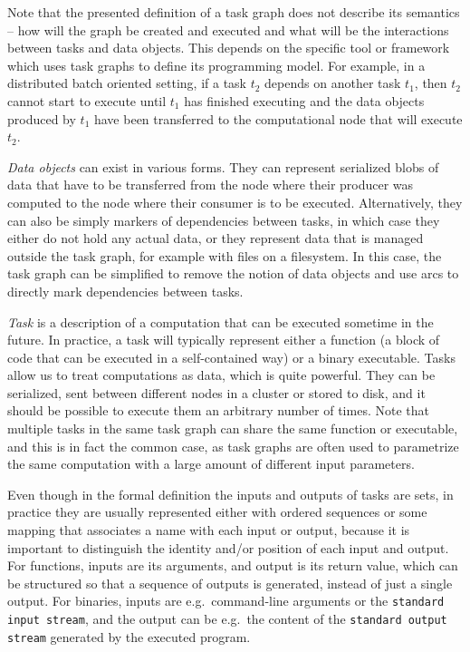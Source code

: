 Note that the presented definition of a task graph does not describe its semantics -- how will the
graph be created and executed and what will be the interactions between tasks and data objects.
This depends on the specific tool or framework which uses task graphs to define its programming
model. For example, in a distributed batch oriented setting, if a task $t_2$
depends on another task $t_1$, then $t_2$ cannot start to execute
until $t_1$ has finished executing and the data objects produced by
$t_1$ have been transferred to the computational node that will execute
$t_2$.

\emph{Data objects} can exist in various forms. They can represent serialized blobs of data that
have to be transferred from the node where their producer was computed to the node where their
consumer is to be executed. Alternatively, they can also be simply markers of dependencies between
tasks, in which case they either do not hold any actual data, or they represent data that is
managed outside the task graph, for example with files on a filesystem. In this case, the task
graph can be simplified to remove the notion of data objects and use arcs to directly mark
dependencies between tasks.

\emph{Task} is a description of a computation that can be executed sometime in the
future. In practice, a task will typically represent either a function (a block of code that can be
executed in a self-contained way) or a binary executable. Tasks allow us to treat computations as
data, which is quite powerful. They can be serialized, sent between different nodes in a cluster or
stored to disk, and it should be possible to execute them an arbitrary number of times. Note that
multiple tasks in the same task graph can share the same function or executable, and this is in
fact the common case, as task graphs are often used to parametrize the same computation with a
large amount of different input parameters.

Even though in the formal definition the inputs and outputs of tasks are sets, in practice they are
usually represented either with ordered sequences or some mapping that associates a name with each
input or output, because it is important to distinguish the identity and/or position of each input
and output. For functions, inputs are its arguments, and output is its return value, which can be
structured so that a sequence of outputs is generated, instead of just a single output. For
binaries, inputs are e.g.\ command-line arguments or the \texttt{standard input stream}, and the output can
be e.g.\ the content of the \texttt{standard output stream} generated by the executed program.

